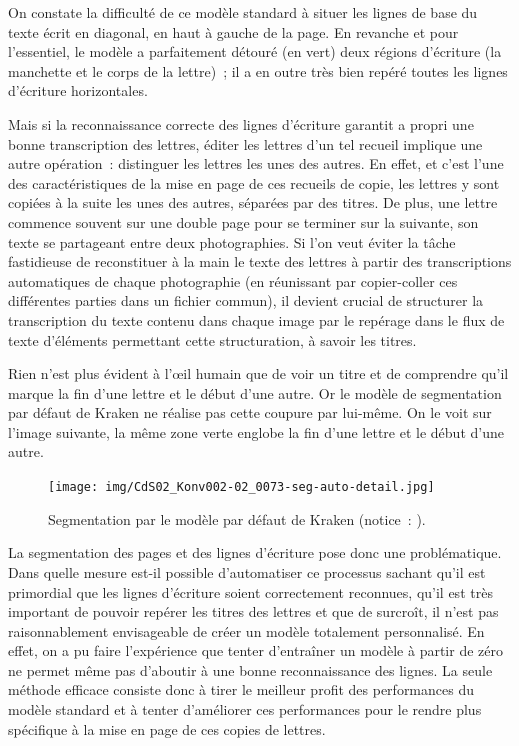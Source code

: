 \documentclass[a4paper,12pt,twoside]{book}
\begin{document}
				On constate la difficulté de ce modèle standard à situer les lignes de base du texte écrit en diagonal, en haut à gauche de la page. En revanche et pour l'essentiel, le modèle a parfaitement détouré (en vert) deux régions d'écriture (la manchette et le corps de la lettre)~; il a en outre très bien repéré toutes les lignes d'écriture horizontales.
				
				Mais si la reconnaissance correcte des lignes d'écriture garantit a propri une bonne transcription des lettres, éditer les lettres d'un tel recueil implique une autre opération~: distinguer les lettres les unes des autres. En effet, et c'est l'une des caractéristiques de la mise en page de ces recueils de copie, les lettres y sont copiées à la suite les unes des autres, séparées par des titres. De plus, une lettre commence souvent sur une double page pour se terminer sur la suivante, son texte se partageant entre deux photographies. Si l'on veut éviter la tâche fastidieuse de reconstituer à la main le texte des lettres à partir des transcriptions automatiques de chaque photographie (en réunissant par copier-coller ces différentes parties dans un fichier commun), il devient crucial de structurer la transcription du texte contenu dans chaque image par le repérage dans le flux de texte d'éléments permettant cette structuration, à savoir les titres.
				
				Rien n'est plus évident à l'œil humain que de voir un titre et de comprendre qu'il marque la fin d'une lettre et le début d'une autre. Or le modèle de \gls{segmentation} par défaut de Kraken ne réalise pas cette coupure par lui-même. On le voit sur l'image suivante, la même zone verte englobe la fin d'une lettre et le début d'une autre.
				
				\begin{figure}[!h]
					\centering
					\texttt{[image: img/CdS02\_Konv002-02\_0073-seg-auto-detail.jpg]}
					\caption{Segmentation par le modèle par défaut de Kraken (notice~: \cite{CdS02073}).}
					\label{}
				\end{figure}
				
				La \gls{segmentation} des pages et des lignes d'écriture pose donc une problématique. Dans quelle mesure est-il possible d'automatiser ce processus sachant qu'il est primordial que les lignes d'écriture soient correctement reconnues, qu'il est très important de pouvoir repérer les titres des lettres et que de surcroît, il n'est pas raisonnablement envisageable de créer un modèle totalement personnalisé. En effet, on a pu faire l'expérience que tenter d'entraîner un modèle à partir de zéro ne permet même pas d'aboutir à une bonne reconnaissance des lignes. La seule méthode efficace consiste donc à tirer le meilleur profit des performances du modèle standard et à tenter d'améliorer ces performances pour le rendre plus spécifique à la mise en page de ces copies de lettres.
				
\end{document}
